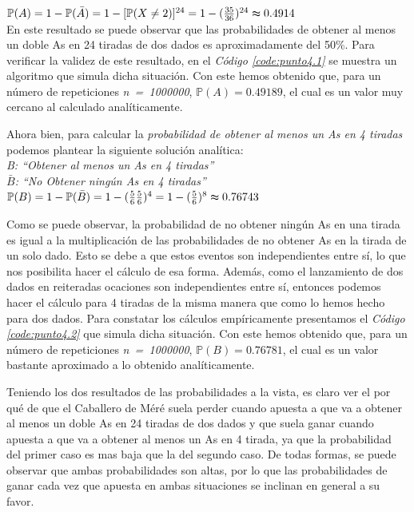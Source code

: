 \documentclass{article}
\newcommand{\refcode}[1]{\textit{Código \ref{#1}}}
\begin{document}
$\mathbb{P}(A) = 1 - \mathbb{P}(\bar{A}) = 1 - [\mathbb{P}(X \neq 2)]^{24} = 1- ({35 \over 36})^{24} \thickapprox 0.4914$ \medskip\\
 
En este resultado se puede observar que las probabilidades de obtener al menos un doble As en 24 tiradas de dos dados es aproximadamente del 50\%. Para verificar la validez de este resultado, en el \refcode{code:punto4.1} se muestra un algoritmo que simula dicha situación.  Con este hemos obtenido que, para un número de repeticiones \mbox{\textit{n = 1000000}}, $\mathbb{P}(A) = 0.49189$, el cual es un valor muy cercano al calculado analíticamente.

 
\bigskip\bigskip

	Ahora bien, para calcular la \textit{probabilidad de obtener al menos un As en 4 tiradas} podemos plantear la siguiente solución analítica:\\

\indent \textit{B: ``Obtener al menos un As en 4 tiradas''}\\
\indent \textit{$\bar{B}$: ``No Obtener ningún As en 4 tiradas''}\\

$\mathbb{P}(B) = 1 - \mathbb{P}(\bar{B}) = 1- ({5 \over 6} {5 \over 6})^4 = 1- ({5 \over 6})^8 \thickapprox 0.76743$\\\bigskip

\noindent Como se puede observar, la probabilidad de no obtener ningún As en una tirada es igual a la multiplicación de las probabilidades de no obtener As en la tirada de un solo dado. Esto se debe a que estos eventos son independientes entre sí, lo que nos posibilita hacer el cálculo de esa forma. Además, como el lanzamiento de dos dados en reiteradas ocaciones son independientes entre sí, entonces podemos hacer el cálculo para 4 tiradas de la misma manera que como lo hemos hecho para dos dados. Para constatar los cálculos empíricamente presentamos el \refcode{code:punto4.2} que simula dicha situación. Con este hemos obtenido que, para un número de repeticiones \mbox{\textit{n = 1000000}}, $\mathbb{P}(B) = 0.76781$, el cual es un valor bastante aproximado a lo obtenido analíticamente.


\bigskip

Teniendo los dos resultados de las probabilidades a la vista, es claro ver el por qué de que el Caballero de Méré suela perder cuando apuesta a que va a obtener al menos un doble As en 24 tiradas de dos dados y que suela ganar cuando apuesta a que va a obtener al menos un As en 4 tirada, ya que la probabilidad del primer caso es mas baja que la del segundo caso. De todas formas, se puede observar que ambas probabilidades son altas, por lo que las probabilidades de ganar cada vez que apuesta en ambas situaciones se inclinan en general a su favor.
\bigskip
\end{document}
